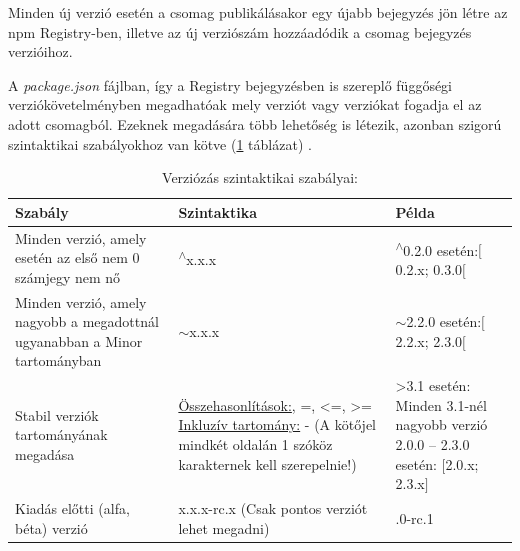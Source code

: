 	Minden új verzió esetén a csomag publikálásakor egy újabb bejegyzés jön létre az npm Registry-ben, illetve az új verziószám hozzáadódik a csomag bejegyzés verzióihoz.
	
	A \emph{package.json} fájlban, így a Registry bejegyzésben is szereplő függőségi verziókövetelményben megadhatóak mely verziót vagy verziókat fogadja el az adott csomagból. Ezeknek megadására több lehetőség is létezik, azonban szigorú szintaktikai szabályokhoz van kötve (\ref{tab:sem-ver-pt1} táblázat) \cite{npm-versioning-semver}.
	\begin{table}[h]
		\centering
		\caption{Verziózás szintaktikai szabályai:}
		\label{tab:sem-ver-pt1}
	\begin{tabularx}{\textwidth} { 
			| >{\centering\arraybackslash}X 
			| >{\centering\arraybackslash}X 
			| >{\centering\arraybackslash}X | }
		\hline
		\textbf{Szabály} & \textbf{Szintaktika} & \textbf{Példa} \\
		\hline
		Minden verzió, amely esetén az első nem 0 számjegy nem nő & \textsuperscript{$\wedge$}x.x.x & \textsuperscript{$\wedge$}0.2.0 esetén:\newline $\big[$0.2.x; 0.3.0$\big[$ \\
		\hline
		Minden verzió, amely nagyobb a megadottnál ugyanabban a Minor tartományban & $\sim$x.x.x & $\sim$2.2.0 esetén:\newline $\big[$2.2.x; 2.3.0$\big[$  \\
		\hline
		Stabil verziók tartományának megadása & \underline{Összehasonlítások:}\newline <, >, =, <=, >= \underline{Inkluzív tartomány:} - \newline(A kötőjel mindkét oldalán 1 szóköz karakternek kell szerepelnie!) & >3.1 esetén: \newline Minden 3.1-nél nagyobb verzió 2.0.0 – 2.3.0 esetén: $\big[$2.0.x; 2.3.x$\big]$ \\
		\hline
		Kiadás előtti (alfa, béta) verzió & x.x.x-rc.x (Csak pontos verziót lehet megadni) & 1.0.0-rc.1 \\
		\hline 
	\end{tabularx}
	\end{table}

	\clearpage


